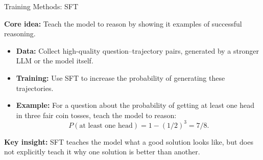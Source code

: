 \documentclass[aspectratio=169]{beamer}
\begin{document}
\begin{frame}{Training Methods: SFT}

\textbf{Core idea:} Teach the model to reason by showing it examples of successful reasoning.

\vspace{0.3cm}

\begin{itemize}
    \item \textbf{Data:} Collect high-quality question--trajectory pairs, generated by a stronger LLM or the model itself.

    \item \textbf{Training:} Use SFT to increase the probability of generating these trajectories.

    \item \textbf{Example:} For a question about the probability of getting at least one head in three fair coin tosses, teach the model to reason:
    \[
    P(\text{at least one head}) = 1-(1/2)^3 = 7/8.
    \]
\end{itemize}

\vspace{0.2cm}

\textbf{Key insight:} SFT teaches the model what a good solution looks like, but does not explicitly teach it why one solution is better than another.

\end{frame}
\end{document}
